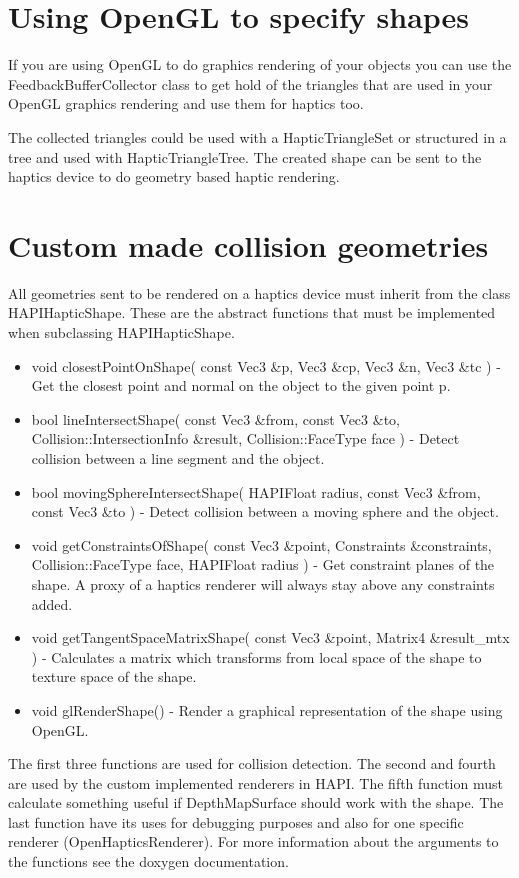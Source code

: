 \section{Using OpenGL to specify shapes}
If you are using OpenGL to do graphics rendering of your objects you
can use the FeedbackBufferCollector class to get hold of the triangles
that are used in your OpenGL graphics rendering and use them for
haptics too. 



The collected triangles could be used with a HapticTriangleSet or structured
in a tree and used with HapticTriangleTree. The created shape can be sent to
the haptics device to do geometry based haptic rendering.

\section{Custom made collision geometries}
All geometries sent to be rendered on a haptics device must
inherit from the class HAPIHapticShape. These are the abstract functions
that must be implemented when subclassing HAPIHapticShape.

\begin{itemize}
\item void closestPointOnShape( const Vec3 \&p, Vec3 \&cp, Vec3 \&n, Vec3 \&tc )
- Get the closest point and normal on the object to the given point p.
\item bool lineIntersectShape( const Vec3 \&from, const Vec3 \&to, Collision::IntersectionInfo \&result, Collision::FaceType face )
- Detect collision between a line segment and the object.
\item bool movingSphereIntersectShape( HAPIFloat radius, const Vec3 \&from, const Vec3 \&to )
- Detect collision between a moving sphere and the object.
\item void getConstraintsOfShape( const Vec3 \&point, Constraints \&constraints, Collision::FaceType face, HAPIFloat radius )
- Get constraint planes of the shape. A proxy of a haptics renderer will always stay above any constraints added.
\item void getTangentSpaceMatrixShape( const Vec3 \&point, Matrix4 \&result\_mtx )
- Calculates a matrix which transforms from local space of the shape to texture space of the shape.
\item void glRenderShape() - Render a graphical representation of the shape using OpenGL.
\end{itemize}

The first three functions are used for collision detection. The second and
fourth are used by the custom implemented renderers in HAPI. The fifth
function must calculate something useful if DepthMapSurface should work with
the shape. The last function have its uses for debugging purposes and also for
one specific renderer (OpenHapticsRenderer). For more information about the
arguments to the functions see the doxygen documentation.
